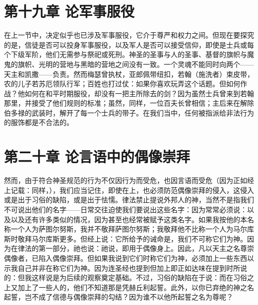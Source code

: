 
\section{第十九章  论军事服役}

在上一节中，决定似乎也已涉及军事服役，它介于尊严和权力之间。但现在要探究的是，信徒是否可以投身军事服役，以及军人是否可以接受信仰，即使是士兵或每个下级军阶，他们无需参与祭祀或死刑。神圣的圣事与人的圣事、基督的旗帜与魔鬼的旗帜、光明的营地与黑暗的营地之间没有一致。一个灵魂不能同时向两个——天主和凯撒——负责。然而梅瑟曾执杖，亚郎佩带纽扣，若翰（施洗者）束皮带，农的儿子若苏厄领队行军；百姓也打过仗：如果你喜欢玩弄这个话题。但如何作战？他如何在和平时期服役，却没有一把主所除去的剑？因为虽然士兵曾来到若翰那里，并接受了他们规则的标准；虽然，同样，一位百夫长曾相信；主后来在解除伯多禄的武装时，解开了每一个士兵的带子。在我们当中，任何被指派给非法行为的服饰都是不合法的。\par


\section{第二十章  论言语中的偶像崇拜}

然而，由于符合神圣规范的行为不仅因行为而受危，也因言语而受危（因为正如经上记载：同样，），我们应当记住，即使在上，也必须防范偶像崇拜的侵入，这侵入或是出于习俗的缺陷，或是出于怯懦。律法禁止提说外邦人的神，当然不是指我们不可说出他们的名字——日常交往迫使我们要说出这些名字：因为常常必须说：以及以及还有许多类似的情况，因为甚至也经常被赋予这类名字。如果我按他的本名称一个人为萨图尔努斯，我并不敬拜萨图尔努斯；我敬拜他不比称一个人为马尔库斯时敬拜马尔库斯更多。但经上说：它所给予的诫命是，我们不可称它们为神。因为在律法的第一部分，祂也说：祂说，即用于偶像身上。因此，凡以天主之名尊崇偶像者，已陷入偶像崇拜。但如果我说到它们时称它们为神，必须加上一些东西以示我自己并非在称它们为神。因为连圣经也提到但加上即正如达味在提到时所说的：但我这样说是为后续的观察奠定基础。不过，习俗的缺陷在于说：而在习俗之上又加上了一些人的，他们不知道那是凭赫丘利起誓。此外，以你已弃绝的神之名起誓，岂不成了信德与偶像崇拜的勾结？因为谁不以他所起誓之名为尊呢？\par

